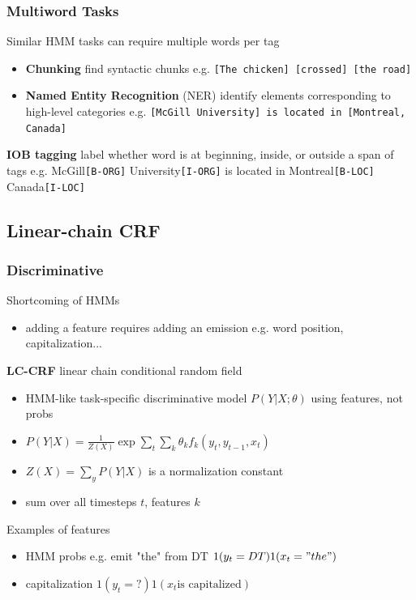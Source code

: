 \documentclass[]{article}
\theoremstyle{definition}
\begin{document}
\subsubsection{Multiword Tasks}%
\label{ssub:multiword_tasks}

Similar HMM tasks can require multiple words per tag
\begin{itemize}
    \item \textbf{Chunking} find syntactic chunks e.g. \texttt{[The chicken] [crossed] [the road]}
    \item \textbf{Named Entity Recognition} (NER) identify elements corresponding to high-level categories e.g. \texttt{[McGill University] is located in [Montreal, Canada]}
\end{itemize}

\textbf{IOB tagging} label whether word is at beginning, inside, or outside a span of tags e.g. McGill\texttt{[B-ORG]} University\texttt{[I-ORG]} is located in Montreal\texttt{[B-LOC]} Canada\texttt{[I-LOC]}

\subsection{Linear-chain CRF}%
\label{ssub:linear_chain_crf}

\subsubsection{Discriminative}%
\label{ssub:discriminative}


Shortcoming of HMMs
\begin{itemize}
    \item adding a feature requires adding an emission e.g. word position, capitalization...
\end{itemize}

\textbf{LC-CRF} linear chain conditional random field
\begin{itemize}
    \item HMM-like task-specific discriminative model $P(Y|X;\theta)$ using features, not probs
    \item $P(Y|X) = \frac{1}{Z(X)} \exp \sum_t \sum_k \theta_k f_k(y_t, y_{t-1}, x_t)$
    \item $Z(X) = \sum_y P(Y|X)$ is a normalization constant
    \item sum over all timesteps $t$, features $k$
\end{itemize}

Examples of features
\begin{itemize}
    \item HMM probs e.g. emit "the" from DT $1(y_t = DT) 1(x_t = "the")$
    \item capitalization $1(y_t = ?) 1(x_t \text{is capitalized})$
\end{itemize}
\end{document}
